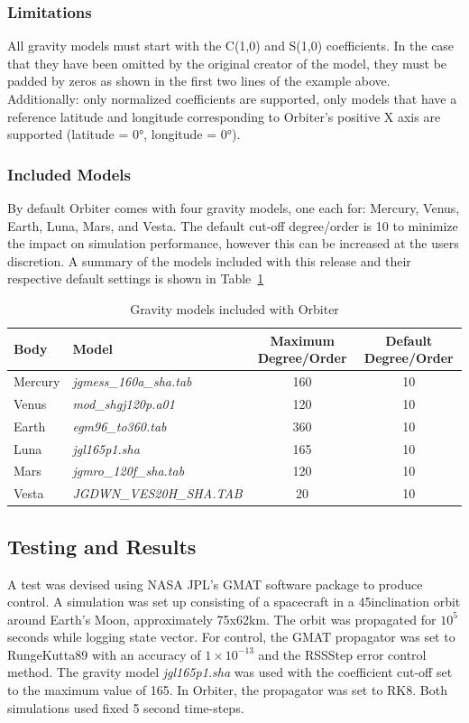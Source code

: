 \documentclass[a4paper]{article}
\begin{document}
\subsubsection{Limitations}
All gravity models must start with the C(1,0) and S(1,0) coefficients. In the case that they have been omitted by the original creator of the model, they must be padded by zeros as shown in the first two lines of the example above. Additionally: only normalized coefficients are supported, only models that have a reference latitude and longitude corresponding to Orbiter's positive X axis are supported (latitude = 0°, longitude = 0°).

\subsubsection{Included Models}
By default Orbiter comes with four gravity models, one each for: Mercury, Venus, Earth, Luna, Mars, and Vesta. The default cut-off degree/order is 10 to minimize the impact on simulation performance, however this can be increased at the users discretion. A summary of the models included with this release and their respective default settings is shown in Table~\ref{tab:models}
\begin{table}[h]
\begin{tabular}{llcc}
Body    	& Model                 					& Maximum Degree/Order 		& Default Degree/Order \\\hline
Mercury 	& \emph{jgmess\_160a\_sha.tab} 		& 160                  			& 10                   \\
Venus   	& \emph{mod\_shgj120p.a01}     		& 120                  			& 10                   \\
Earth   	& \emph{egm96\_to360.tab}     			& 360                 			& 10                   \\
Luna    	&\emph{ jgl165p1.sha}				& 165                  			& 10                   \\
Mars    	&\emph{ jgmro\_120f\_sha.tab}  		& 120                  			& 10		     \\
Vesta    	&\emph{ JGDWN\_VES20H\_SHA.TAB}		& 20                  			& 10
\end{tabular}
\caption{Gravity models included with Orbiter}
\label{tab:models}
\end{table}

\subsection{Testing and Results}
A test was devised using NASA JPL's GMAT software package to produce control. A simulation was set up consisting of a spacecraft in a 45\textdegree inclination orbit around Earth's Moon, approximately 75x62km. The orbit was propagated for $10^5$ seconds while logging state vector. For control, the GMAT propagator was set to RungeKutta89 with an accuracy of $1\times10^{-13}$ and the RSSStep error control method. The gravity model \emph{jgl165p1.sha} was used with the coefficient cut-off set to the maximum value of 165. In Orbiter, the propagator was set to RK8. Both simulations used fixed 5 second time-steps. 
\end{document}
